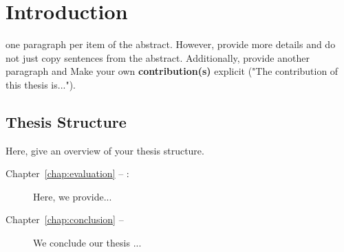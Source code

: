 
\chapter{Introduction}
one paragraph per item of the abstract. However, provide more details and do not just copy sentences from the abstract. 
Additionally, provide  another paragraph and  Make your own \textbf{contribution(s)} explicit ("The contribution of this thesis is...").


\section*{Thesis Structure}
Here, give an overview of your thesis structure.
\begin{description}
\item[Chapter~\ref{chap:evaluation} -- :] Here, we provide...
\item[Chapter~\ref{chap:conclusion} -- ] We conclude our thesis ...
\end{description}
